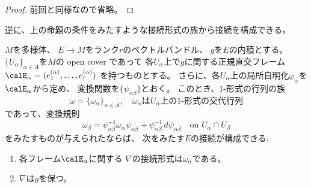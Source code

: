 \documentclass[report]{jlreq}
\begin{document}
\begin{proof}
    前回と同様なので省略。
\end{proof}

逆に、上の命題の条件をみたすような接続形式の族から接続を構成できる。

\begin{proposition}[接続形式から定まる接続]
    $M$を多様体、
    $E \to M$をランク$r$のベクトルバンドル、
    $g$を$E$の内積とする。
    $\{ U_\alpha \}_{\alpha \in A}$を$M$の open cover であって
    各$U_\alpha$上で$g$に関する正規直交フレーム
    $\calE_\alpha = (e^{(\alpha)}_1, \dots, e^{(\alpha)}_r)$
    を持つものとする。
    さらに、各$U_\alpha$上の局所自明化$\varphi_\alpha$を
    $\calE_\alpha$から定め、
    変換関数を$\{ \psi_{\alpha\beta} \}$とおく。
    このとき、$1$-形式の行列の族
    \begin{equation}
        \omega = \{ \omega_\alpha \}_{\alpha \in A},
        \quad
        \text{$\omega_\alpha$は$U_\alpha$上の$1$-形式の交代行列}
    \end{equation}
    であって、変換規則
    \begin{equation}
        \omega_\beta
            = \psi_{\alpha\beta}^{-1} \omega_\alpha \psi_{\alpha\beta}
            + \psi_{\alpha\beta}^{-1} \, d \psi_{\alpha\beta}
            \quad
            \text{on $U_\alpha \cap U_\beta$}
    \end{equation}
    をみたすものが与えられたならば、
    次をみたす$E$の接続が構成できる:
    \begin{enumerate}
        \item 各フレーム$\calE_\alpha$に関する
            $\nabla$の接続形式は$\omega_\alpha$である。
        \item $\nabla$は$g$を保つ。
    \end{enumerate}
\end{proposition}
\end{document}
